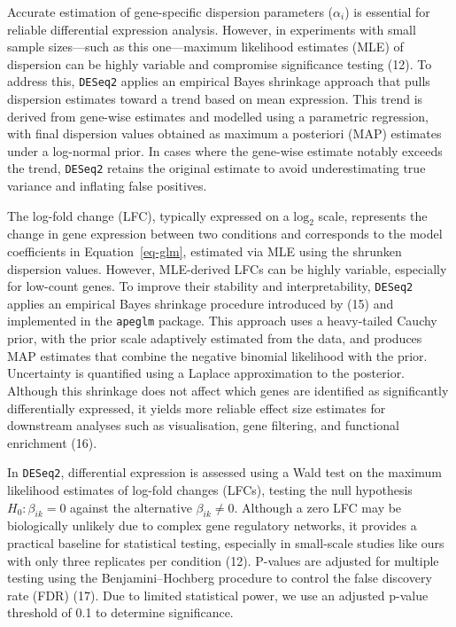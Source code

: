 \documentclass[
  a4paper,
]{scrreprt}
\begin{document}
Accurate estimation of gene-specific dispersion parameters
(\(\alpha_i\)) is essential for reliable differential expression
analysis. However, in experiments with small sample sizes---such as this
one---maximum likelihood estimates (MLE) of dispersion can be highly
variable and compromise significance testing (12). To address this,
\texttt{DESeq2} applies an empirical Bayes shrinkage approach that pulls
dispersion estimates toward a trend based on mean expression. This trend
is derived from gene-wise estimates and modelled using a parametric
regression, with final dispersion values obtained as maximum a
posteriori (MAP) estimates under a log-normal prior. In cases where the
gene-wise estimate notably exceeds the trend, \texttt{DESeq2} retains
the original estimate to avoid underestimating true variance and
inflating false positives.

The log-fold change (LFC), typically expressed on a \(\text{log}_2\)
scale, represents the change in gene expression between two conditions
and corresponds to the model coefficients in Equation~\ref{eq-glm},
estimated via MLE using the shrunken dispersion values. However,
MLE-derived LFCs can be highly variable, especially for low-count genes.
To improve their stability and interpretability, \texttt{DESeq2} applies
an empirical Bayes shrinkage procedure introduced by (15) and
implemented in the \texttt{apeglm} package. This approach uses a
heavy-tailed Cauchy prior, with the prior scale adaptively estimated
from the data, and produces MAP estimates that combine the negative
binomial likelihood with the prior. Uncertainty is quantified using a
Laplace approximation to the posterior. Although this shrinkage does not
affect which genes are identified as significantly differentially
expressed, it yields more reliable effect size estimates for downstream
analyses such as visualisation, gene filtering, and functional
enrichment (16).

In \texttt{DESeq2}, differential expression is assessed using a Wald
test on the maximum likelihood estimates of log-fold changes (LFCs),
testing the null hypothesis \(H_0: \beta_{ik} = 0\) against the
alternative \(\beta_{ik} \neq 0\). Although a zero LFC may be
biologically unlikely due to complex gene regulatory networks, it
provides a practical baseline for statistical testing, especially in
small-scale studies like ours with only three replicates per condition
(12). P-values are adjusted for multiple testing using the
Benjamini--Hochberg procedure to control the false discovery rate (FDR)
(17). Due to limited statistical power, we use an adjusted p-value
threshold of 0.1 to determine significance.
\end{document}
